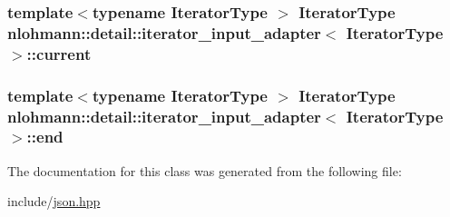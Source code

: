\subsubsection[{\texorpdfstring{current}{current}}]{\setlength{\rightskip}{0pt plus 5cm}template$<$typename Iterator\+Type $>$ Iterator\+Type {\bf nlohmann\+::detail\+::iterator\+\_\+input\+\_\+adapter}$<$ Iterator\+Type $>$\+::current\hspace{0.3cm}{\ttfamily [private]}}\hypertarget{classnlohmann_1_1detail_1_1iterator__input__adapter_a8abccad27590d381a94e474b16161938}{}\label{classnlohmann_1_1detail_1_1iterator__input__adapter_a8abccad27590d381a94e474b16161938}
\subsubsection[{\texorpdfstring{end}{end}}]{\setlength{\rightskip}{0pt plus 5cm}template$<$typename Iterator\+Type $>$ Iterator\+Type {\bf nlohmann\+::detail\+::iterator\+\_\+input\+\_\+adapter}$<$ Iterator\+Type $>$\+::end\hspace{0.3cm}{\ttfamily [private]}}\hypertarget{classnlohmann_1_1detail_1_1iterator__input__adapter_a8aa29994ca6fdc0f8c96abf9151738ab}{}\label{classnlohmann_1_1detail_1_1iterator__input__adapter_a8aa29994ca6fdc0f8c96abf9151738ab}


The documentation for this class was generated from the following file\+:\begin{DoxyCompactItemize}
\item 
include/\hyperlink{json_8hpp}{json.\+hpp}\end{DoxyCompactItemize}
